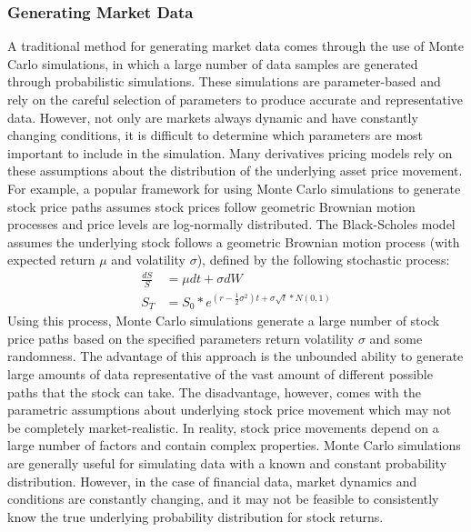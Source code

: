 \subsubsection{Generating Market Data}
A traditional method for generating market data comes through the use of Monte Carlo simulations, in which a large number of data samples are generated through probabilistic simulations. These simulations are parameter-based and rely on the careful selection of parameters to produce accurate and representative data. However, not only are markets always dynamic and have constantly changing conditions, it is difficult to determine which parameters are most important to include in the simulation. Many derivatives pricing models rely on these assumptions about the distribution of the underlying asset price movement. For example, a popular framework for using Monte Carlo simulations to generate stock price paths assumes stock prices follow geometric Brownian motion processes and price levels are log-normally distributed. The Black-Scholes model assumes the underlying stock follows a geometric Brownian motion process (with expected return $\mu$ and volatility $\sigma$), defined by the following stochastic process:
\begin{equation}
\begin{aligned}
    \frac{dS}{S} &= \mu dt+\sigma dW\\
    S_T &= S_0*e^{(r-\frac{1}{2}\sigma^2)t+\sigma\sqrt{t}*N(0,1)}
\end{aligned}
\end{equation}
Using this process, Monte Carlo simulations generate a large number of stock price paths based on the specified parameters return volatility $\sigma$ and some randomness. The advantage of this approach is the unbounded ability to generate large amounts of data representative of the vast amount of different possible paths that the stock can take. The disadvantage, however, comes with the parametric assumptions about underlying stock price movement which may not be completely market-realistic. In reality, stock price movements depend on a large number of factors and contain complex properties. Monte Carlo simulations are generally useful for simulating data with a known and constant probability distribution. However, in the case of financial data, market dynamics and conditions are constantly changing, and it may not be feasible to consistently know the true underlying probability distribution for stock returns.
\\
\\

